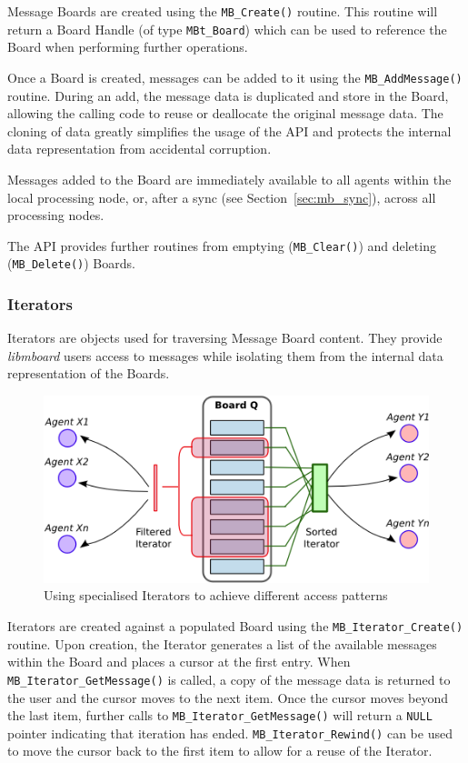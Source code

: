 Message Boards are created using the \texttt{MB\_Create()} routine. This routine will return a Board Handle (of type \texttt{MBt\_Board}) which can be used to reference the Board when performing further operations.

Once a Board is created, messages can be added to it using the \texttt{MB\_AddMessage()} routine. During an add, the message data is duplicated and store in the Board, allowing the calling code to reuse or deallocate the original message data. The cloning of data greatly simplifies the usage of the API and protects the internal data representation from accidental corruption. 

Messages added to the Board are immediately available to all agents within the local processing node, or, after a sync (see Section~\ref{sec:mb_sync}), across all processing nodes.

The API provides further routines from emptying (\texttt{MB\_Clear()}) and deleting  (\texttt{MB\_Delete()}) Boards.

\subsubsection{Iterators}
\label{sec:mb_interators}

Iterators are objects used for traversing Message Board content. They provide \textit{libmboard} users access to messages while isolating them from the internal data representation of the Boards. 

\begin{figure}[h]
 \centering
  \includegraphics[scale=0.8]{iterator.png}
 \caption{Using specialised Iterators to achieve different access patterns}
 \label{fig:mb_iterators}
\end{figure}

Iterators are created against a populated Board using the \texttt{MB\_Iterator\_Create()} routine. Upon creation, the Iterator generates a list of the available messages within the Board and places a cursor at the first entry. When \texttt{MB\_Iterator\_GetMessage()} is called, a copy of the message data is returned to the user and the cursor moves to the next item. Once the cursor moves beyond the last item, further calls to \texttt{MB\_Iterator\_GetMessage()} will return a \texttt{NULL} pointer indicating that iteration has ended. \texttt{MB\_Iterator\_Rewind()} can be used to move the cursor back to the first item to allow for a reuse of the Iterator.

